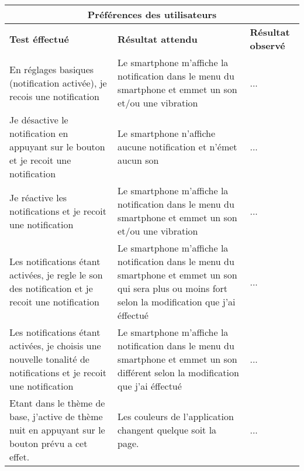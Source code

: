 \documentclass{article}
\begin{document}
  \begin{center}
    \begin{tabular}{|p{5cm}|p{5cm}|p{5cm}|}
      \hline
      \multicolumn{3}{|c|}{\textbf{Préférences des utilisateurs}} \\
      \hline
      \textbf{Test éffectué} & \textbf{Résultat attendu} & \textbf{Résultat observé} \\
      \hline

      En réglages basiques (notification activée), je recois une notification&
      Le smartphone m'affiche la notification dans le menu du smartphone et emmet un son et/ou une vibration&
      ... \\

      \hline
      \hline
      Je désactive le notification en appuyant sur le bouton et je recoit une notification&
      Le smartphone n'affiche aucune notification et n'émet aucun son&
      ... \\

      \hline
      \hline
      Je réactive les notifications et je recoit une notification&
      Le smartphone m'affiche la notification dans le menu du smartphone et emmet un son et/ou une vibration&
      ... \\

      \hline
      \hline
      Les notifications étant activées, je regle le son des notification et je recoit une notification&
      Le smartphone m'affiche la notification dans le menu du smartphone et emmet un son qui sera plus ou moins fort selon la modification que j'ai éffectué&
      ... \\

      \hline
      \hline
      Les notifications étant activées, je choisis une nouvelle tonalité de notifications et je recoit une notification&
      Le smartphone m'affiche la notification dans le menu du smartphone et emmet un son différent selon la modification que j'ai éffectué&
      ... \\

      \hline
      \hline
      Etant dans le thème de base, j'active de thème nuit en appuyant sur le bouton prévu a cet effet.&
      Les couleurs de l'application changent quelque soit la page.&
      ... \\



      \hline

    \end{tabular}
  \end{center}
\end{document}
